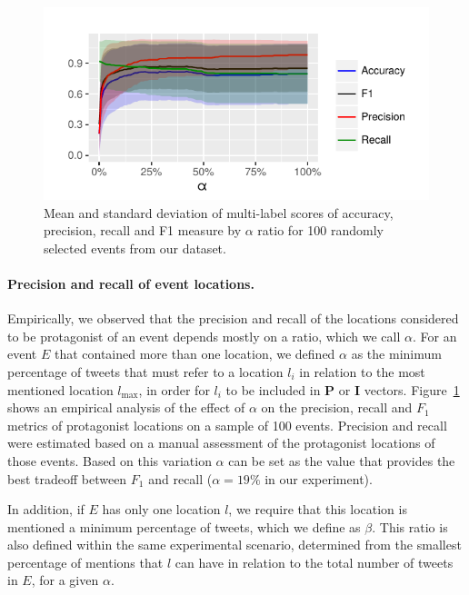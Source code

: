 \begin{figure}[h]
  \centering
  \includegraphics[width=\textwidth]{figures/geopolitical/k_accuracy_recall.pdf}
  \caption[Mean and standard deviation of multi-label scores]{Mean and standard
  deviation of multi-label scores of accuracy, precision, recall and F1 measure
  by $\alpha$ ratio for 100 randomly selected events from our dataset.}
  \label{fig:eval}
\end{figure}

\medskip
\paragraph{Precision and recall of event locations.}
%
Empirically, we observed that the precision and recall of the locations
considered to be protagonist of an event depends mostly on a ratio, which we
call $\alpha$.
%
For an event $E$ that contained more than one location, we defined $\alpha$ as
the minimum percentage of tweets that must refer to a location $l_i$ in relation
to the most mentioned location $l_{\mathrm{max}}$, in order for $l_i$ to be
included in $\mathbf{P}$ or $\mathbf{I}$ vectors.
%
Figure~\ref{fig:eval} shows an empirical analysis of the effect of $\alpha$ on
the precision, recall and $F_1$ metrics of protagonist locations on a sample of
100 events.  
%
Precision and recall were estimated based on a manual assessment of the
protagonist locations of those events. 
%
Based on this variation $\alpha$ can be set as the value that provides the best
tradeoff between $F_1$ and recall ($\alpha = 19\%$ in our experiment).

In addition, if $E$ has only one location $l$, we require that this location is
mentioned a minimum percentage of tweets, which we define as $\beta$. This ratio
is also defined within the same experimental scenario, determined from the
smallest percentage of mentions that $l$ can have in relation to the total
number of tweets in $E$, for a given $\alpha$.



